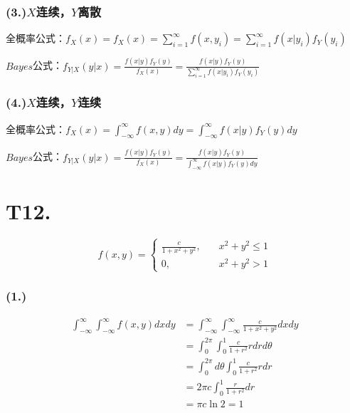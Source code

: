 \documentclass{article}
\newcommand\f[2]{\frac{#1}{#2}}
\begin{document}
\subsubsection*{(3.)$X$连续，$Y$离散}

全概率公式：$f_X(x)=f_X(x)=\sum_{i=1}^{\infty}f(x,y_i)=\sum_{i=1}^{\infty}f(x|y_i)f_Y(y_i)$

$Bayes$公式：$f_{Y|X}(y|x)=\f{f(x|y)f_Y(y)}{f_X(x)}=\f{f(x|y)f_Y(y)}{\sum_{i=1}^{\infty}f(x|y_i)f_Y(y_i)}$

\subsubsection*{(4.)$X$连续，$Y$连续}

全概率公式：$f_X(x)=\int_{-\infty}^{\infty}f(x,y)dy=\int_{-\infty}^{\infty}f(x|y)f_Y(y)dy$

$Bayes$公式：$f_{Y|X}(y|x)=\f{f(x|y)f_Y(y)}{f_X(x)}=\f{f(x|y)f_Y(y)}{\int_{-\infty}^{\infty}f(x|y)f_Y(y)dy}$

\section*{T12. }

$$f(x,y)=
\begin{cases}
    \f{c}{1+x^2+y^2}, &\quad x^2+y^2\leq1\\
    0, &\quad x^2+y^2>1
\end{cases}
$$

\subsubsection*{(1.)}

\begin{equation}
    \begin{aligned}
        \int_{-\infty}^{\infty}\int_{-\infty}^{\infty}f(x,y)dxdy
        & =\int_{-\infty}^{\infty}\int_{-\infty}^{\infty}\f{c}{1+x^2+y^2}dxdy\\
        & =\int_{0}^{2\pi}\int_{0}^{1}\f{c}{1+r^2}rdrd\theta\\
        & =\int_{0}^{2\pi}d\theta\int_{0}^{1}\f{c}{1+r^2}rdr\\
        & =2\pi c\int_{0}^{1}\f{r}{1+r^2}dr\\
        & =\pi c\ln2=1\\
    \end{aligned}
\end{equation}
\end{document}
